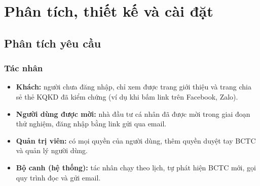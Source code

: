 \documentclass[12pt,a4paper]{report}
\begin{document}
\chapter{Phân tích, thiết kế và cài đặt}\label{chap:thietke}

\section{Phân tích yêu cầu}
\subsection{Tác nhân}
\begin{itemize}
  \item \textbf{Khách:} người chưa đăng nhập, chỉ xem được trang giới thiệu và trang chia sẻ thẻ KQKD đã kiểm chứng (ví
        dụ khi bấm link trên Facebook, Zalo).
  \item \textbf{Người dùng được mời:} nhà đầu tư cá nhân đã được mời trong giai đoạn thử nghiệm, đăng nhập bằng link
        gửi qua email.
  \item \textbf{Quản trị viên:} có mọi quyền của người dùng, thêm quyền duyệt tay BCTC và quản lý người dùng.
  \item \textbf{Bộ canh (hệ thống):} tác nhân chạy theo lịch, tự phát hiện BCTC mới, gọi quy trình đọc và gửi email.
\end{itemize}
\end{document}
